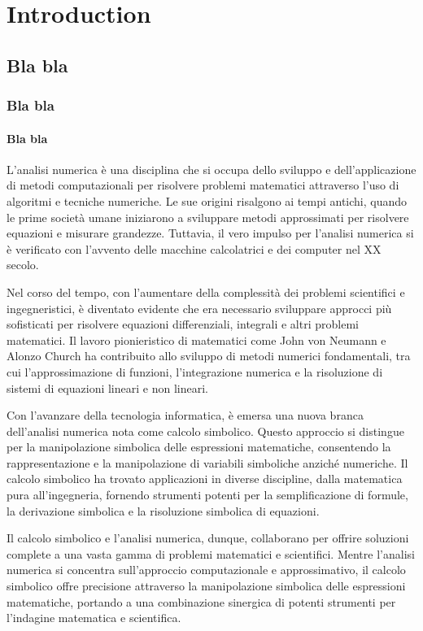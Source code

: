 
\chapter{Introduction}
\label{chapter:introduction}

\section{Bla bla}
\subsection{Bla bla}
\subsubsection{Bla bla}

L'analisi numerica è una disciplina che si occupa dello sviluppo e dell'applicazione di metodi computazionali per risolvere problemi matematici attraverso l'uso di algoritmi e tecniche numeriche. Le sue origini risalgono ai tempi antichi, quando le prime società umane iniziarono a sviluppare metodi approssimati per risolvere equazioni e misurare grandezze. Tuttavia, il vero impulso per l'analisi numerica si è verificato con l'avvento delle macchine calcolatrici e dei computer nel XX secolo.

Nel corso del tempo, con l'aumentare della complessità dei problemi scientifici e ingegneristici, è diventato evidente che era necessario sviluppare approcci più sofisticati per risolvere equazioni differenziali, integrali e altri problemi matematici. Il lavoro pionieristico di matematici come John von Neumann e Alonzo Church ha contribuito allo sviluppo di metodi numerici fondamentali, tra cui l'approssimazione di funzioni, l'integrazione numerica e la risoluzione di sistemi di equazioni lineari e non lineari.

Con l'avanzare della tecnologia informatica, è emersa una nuova branca dell'analisi numerica nota come calcolo simbolico. Questo approccio si distingue per la manipolazione simbolica delle espressioni matematiche, consentendo la rappresentazione e la manipolazione di variabili simboliche anziché numeriche. Il calcolo simbolico ha trovato applicazioni in diverse discipline, dalla matematica pura all'ingegneria, fornendo strumenti potenti per la semplificazione di formule, la derivazione simbolica e la risoluzione simbolica di equazioni.

Il calcolo simbolico e l'analisi numerica, dunque, collaborano per offrire soluzioni complete a una vasta gamma di problemi matematici e scientifici. Mentre l'analisi numerica si concentra sull'approccio computazionale e approssimativo, il calcolo simbolico offre precisione attraverso la manipolazione simbolica delle espressioni matematiche, portando a una combinazione sinergica di potenti strumenti per l'indagine matematica e scientifica.
